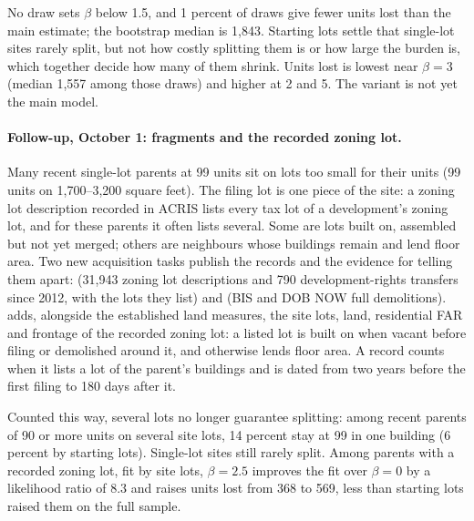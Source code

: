 No draw sets $\beta$ below 1.5, and 1 percent of draws give fewer units lost
than the main estimate; the bootstrap median is 1,843. Starting lots settle
that single-lot sites rarely split, but not how costly splitting them is or how
large the burden is, which together decide how many of them shrink. Units lost
is lowest near $\beta = 3$ (median 1,557 among those draws) and higher at 2 and
5. The variant is not yet the main model.

\paragraph{Follow-up, October 1: fragments and the recorded zoning lot.}
Many recent single-lot parents at 99 units sit on lots too small for their
units (99 units on 1,700--3,200 square feet). The filing lot is one piece of the
site: a zoning lot description recorded in ACRIS lists every tax lot of a
development's zoning lot, and for these parents it often lists several. Some
are lots built on, assembled but not yet merged; others are neighbours whose
buildings remain and lend floor area. Two new acquisition tasks publish the
records and the evidence for telling them apart:
 (31,943 zoning lot descriptions and 790
development-rights transfers since 2012, with the lots they list) and
 (BIS and DOB NOW full demolitions).
 adds, alongside the established land
measures, the site lots, land, residential FAR and frontage of the recorded
zoning lot: a listed lot is built on when vacant before filing or demolished
around it, and otherwise lends floor area. A record counts when it lists a lot
of the parent's buildings and is dated from two years before the first filing
to 180 days after it.

Counted this way, several lots no longer guarantee splitting: among recent
parents of 90 or more units on several site lots, 14 percent stay at 99 in one
building (6 percent by starting lots). Single-lot sites still rarely split.
Among parents with a recorded zoning lot, fit by site lots, $\beta = 2.5$
improves the fit over $\beta = 0$ by a likelihood ratio of 8.3 and raises units
lost from 368 to 569, less than starting lots raised them on the full sample.

